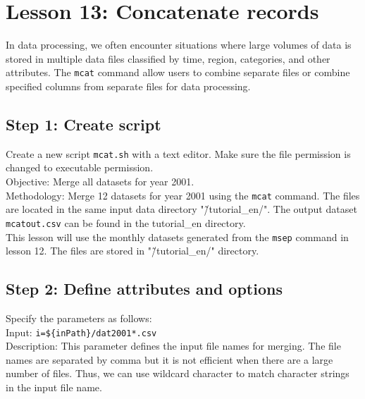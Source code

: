 

%


\section{Lesson 13: Concatenate records }

In data processing, we often encounter situations where large volumes of data is stored in multiple data files classified by time, region, categories, and other attributes. The \verb|mcat| command allow users to combine separate files or combine specified columns from separate files for data processing. 

\subsection{Step 1: Create script}

Create a new script \verb|mcat.sh| with a text editor. Make sure the file permission is changed to executable permission. \\

Objective:  Merge all datasets for year 2001.  \\ 

Methodology: Merge 12 datasets for year 2001 using the \verb|mcat| command. The files are located in the same input data directory "\~/tutorial\_en/".  The output dataset \verb|mcatout.csv| can be found in the tutorial\_en directory. \\


This lesson will use the monthly datasets generated from the \verb|msep| command in lesson 12. The files are stored in "\~/tutorial\_en/" directory.


 \subsection{Step 2: Define attributes and options }

{\setlength{\parindent}{0cm}

Specify the parameters as follows: \\

Input: 		\verb|i=${inPath}/dat2001*.csv| \\
Description: 	This parameter defines the input file names for merging. The file names are separated by comma but it is not efficient when there are a large number of files. Thus, we can use wildcard character to match character strings in the input file name. 

}

